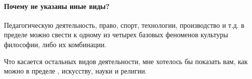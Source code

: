 \paragraph{Почему не указаны иные виды?} 

Педагогическую деятельность, право, спорт, технологии, производство и т.д. в пределе можно свести к одному из четырех базовых феноменов культуры философии, либо их комбинации.







Что касается остальных видов
деятельности, мне хотелось бы показать вам, как можно в пределе , искусству, науки и
религии. 

